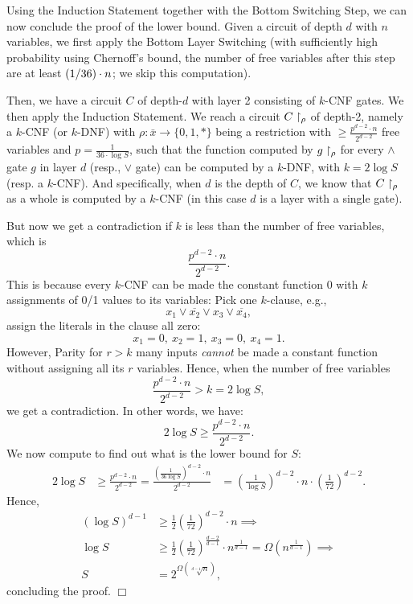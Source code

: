Using the Induction Statement together with the Bottom Switching Step,
we can now conclude the proof of the lower bound.
Given a circuit of depth $d$ with $n$ variables,
we first apply the Bottom Layer Switching (with sufficiently high probability using Chernoff's bound, the number of free variables after this step
are at least $(1/36)\cdot n$; we skip this computation).

Then, we have a circuit $C$ of depth-$d$ with layer 2 consisting of  $k$-CNF gates. We  then apply the Induction Statement. We reach a circuit $C \upharpoonright_\rho$ of depth-2, namely a $k$-CNF (or $k$-DNF) with
$\rho: \bar{x} \rightarrow\{0,1, *\}$ being a restriction
with $\geq \frac{p^{d-2} \cdot n}{2^{d-2}}$ free variables and $p=\frac{1}{36 \cdot \log S}$, such that the function computed by $g\upharpoonright_\rho$ for every $\land$ gate $g$ in layer $d$ (resp., $\lor$ gate) can be computed by a $k$-DNF, with $k=2 \log S$ (resp. a $k$-CNF).
And specifically, when $d$ is the depth of $C$, we know that $C\upharpoonright_\rho$ as a whole is computed by a $k$-CNF (in this case $d$ is a layer with a single gate). 


But now we get a contradiction if \( k \) is less than the number of free variables, which is 
\[
\frac{p^{d-2} \cdot n}{2^{d-2}}.
\]
This is because every \( k \)-CNF can be made the  constant function 0 with \( k \) assignments of 0/1 values to its variables: Pick one \( k \)-clause, e.g.,
\[
x_1 \lor \overline{x_2} \lor x_3 \lor \overline{x_4},
\]
assign the literals in the clause all zero: 
\[
x_1 = 0, \ x_2 = 1, \ x_3 = 0, \ x_4 = 1.
\]
However, Parity for \( r > k \) many inputs \emph{cannot} be made a constant function without assigning all its \( r \) variables. Hence, when the number of free variables
\[
\frac{p^{d-2} \cdot n}{2^{d-2}} > k = 2 \log S,
\]
we get  a contradiction.
In other words, we have:
\[
2 \log S \geq \frac{p^{d-2} \cdot n}{2^{d-2}}.
\]
We now compute to find out what is the lower bound for $S$:
\begin{align*}
    2 \log S &\ge  \frac{p^{d-2} \cdot n}{2^{d-2}} 
 = \frac{\left(\frac{1}{36 \log S}\right)^{d-2} \cdot n}{2^{d-2}} 
    & = \left(\frac{1}{\log S}\right)^{d-2} \cdot n \cdot \left(\frac{1}{72}\right)^{d-2}.
\end{align*}
Hence, 
\begin{align*}
    \left(\log S\right)^{d-1} &\ge \frac{1}{2} \left(\frac{1}{72}\right)^{d-2} \cdot n \implies \\
    \log S &\ge \frac{1}{2} \left(\frac{1}{72}\right)^{\frac{d-2}{d-1}} \cdot n^{\frac{1}{d-1}}
= \Omega \left(n^{\frac{1}{d-1}}\right)  \implies \\
     S &=  2^{\Omega ({\sqrt[d-1]{n}})},
\end{align*}
concluding the proof. 
 \hfill $\Box$

